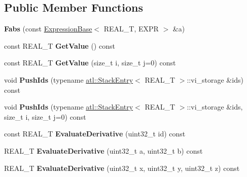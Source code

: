 \subsection*{Public Member Functions}
\begin{DoxyCompactItemize}
\item 
\hypertarget{structatl_1_1_fabs_a209f2e5eef31610984955cc8c397a31b}{{\bfseries Fabs} (const \hyperlink{structatl_1_1_expression_base}{Expression\+Base}$<$ R\+E\+A\+L\+\_\+\+T, E\+X\+P\+R $>$ \&a)}\label{structatl_1_1_fabs_a209f2e5eef31610984955cc8c397a31b}

\item 
\hypertarget{structatl_1_1_fabs_ac8ccc3d35e00f868a9d72cd7427005aa}{const R\+E\+A\+L\+\_\+\+T {\bfseries Get\+Value} () const }\label{structatl_1_1_fabs_ac8ccc3d35e00f868a9d72cd7427005aa}

\item 
\hypertarget{structatl_1_1_fabs_ac3ab5f58693e26604421c4705b8e26e5}{const R\+E\+A\+L\+\_\+\+T {\bfseries Get\+Value} (size\+\_\+t i, size\+\_\+t j=0) const }\label{structatl_1_1_fabs_ac3ab5f58693e26604421c4705b8e26e5}

\item 
\hypertarget{structatl_1_1_fabs_a515bb4e9b6c9aa45771a1e9d171b0874}{void {\bfseries Push\+Ids} (typename \hyperlink{structatl_1_1_stack_entry}{atl\+::\+Stack\+Entry}$<$ R\+E\+A\+L\+\_\+\+T $>$\+::vi\+\_\+storage \&ids) const }\label{structatl_1_1_fabs_a515bb4e9b6c9aa45771a1e9d171b0874}

\item 
\hypertarget{structatl_1_1_fabs_a6591506f92da3e4526865b0ac0362e9d}{void {\bfseries Push\+Ids} (typename \hyperlink{structatl_1_1_stack_entry}{atl\+::\+Stack\+Entry}$<$ R\+E\+A\+L\+\_\+\+T $>$\+::vi\+\_\+storage \&ids, size\+\_\+t i, size\+\_\+t j=0) const }\label{structatl_1_1_fabs_a6591506f92da3e4526865b0ac0362e9d}

\item 
\hypertarget{structatl_1_1_fabs_a8c6e6aec1dd8045f4b9b99633c4da571}{const R\+E\+A\+L\+\_\+\+T {\bfseries Evaluate\+Derivative} (uint32\+\_\+t id) const }\label{structatl_1_1_fabs_a8c6e6aec1dd8045f4b9b99633c4da571}

\item 
\hypertarget{structatl_1_1_fabs_a698c05a67f7731ddfda90486771bbf81}{R\+E\+A\+L\+\_\+\+T {\bfseries Evaluate\+Derivative} (uint32\+\_\+t a, uint32\+\_\+t b) const }\label{structatl_1_1_fabs_a698c05a67f7731ddfda90486771bbf81}

\item 
\hypertarget{structatl_1_1_fabs_abfd108ac8bacee559ba29b9a3a89782b}{R\+E\+A\+L\+\_\+\+T {\bfseries Evaluate\+Derivative} (uint32\+\_\+t x, uint32\+\_\+t y, uint32\+\_\+t z) const }\label{structatl_1_1_fabs_abfd108ac8bacee559ba29b9a3a89782b}


\end{DoxyCompactItemize}
